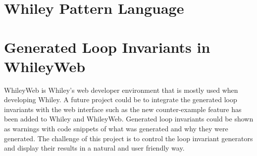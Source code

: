 \section{Whiley Pattern Language}


\section{Generated Loop Invariants in WhileyWeb}

WhileyWeb is Whiley's web developer environment that is mostly used when
developing Whiley.
A future project could be to integrate the generated loop invariants with
the web interface such as the new counter-example feature has been added to
Whiley and WhileyWeb.
Generated loop invariants could be shown as warnings with code snippets of what
was generated and why they were generated.
The challenge of this project is to control the loop invariant
generators and display their results in a natural and user friendly way.
